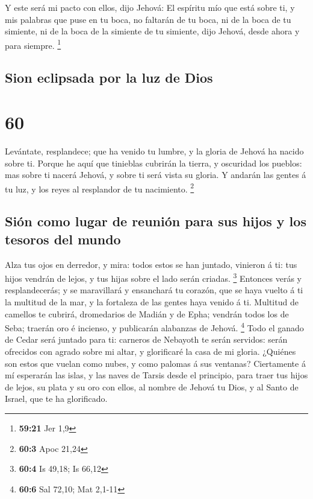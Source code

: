  Y este será mi pacto con ellos, dijo Jehová: El espíritu
mío que está sobre ti, y mis palabras que puse en tu boca, no faltarán
de tu boca, ni de la boca de tu simiente, ni de la boca de la simiente
de tu simiente, dijo Jehová, desde ahora y para siempre. \footnote{\textbf{59:21}
  Jer 1,9}

\hypertarget{sion-eclipsada-por-la-luz-de-dios}{%
\subsection{Sion eclipsada por la luz de
Dios}\label{sion-eclipsada-por-la-luz-de-dios}}

\hypertarget{section-59}{%
\section{60}\label{section-59}}

 Levántate, resplandece; que ha venido tu lumbre, y la
gloria de Jehová ha nacido sobre ti.  Porque he aquí que
tinieblas cubrirán la tierra, y oscuridad los pueblos: mas sobre ti
nacerá Jehová, y sobre ti será vista su gloria.  Y andarán
las gentes á tu luz, y los reyes al resplandor de tu nacimiento.
\footnote{\textbf{60:3} Apoc 21,24}

\hypertarget{siuxf3n-como-lugar-de-reuniuxf3n-para-sus-hijos-y-los-tesoros-del-mundo}{%
\subsection{Sión como lugar de reunión para sus hijos y los tesoros del
mundo}\label{siuxf3n-como-lugar-de-reuniuxf3n-para-sus-hijos-y-los-tesoros-del-mundo}}

 Alza tus ojos en derredor, y mira: todos estos se han
juntado, vinieron á ti: tus hijos vendrán de lejos, y tus hijas sobre el
lado serán criadas. \footnote{\textbf{60:4} Is 49,18; Is 66,12}
 Entonces verás y resplandecerás; y se maravillará y
ensanchará tu corazón, que se haya vuelto á ti la multitud de la mar, y
la fortaleza de las gentes haya venido á ti.  Multitud de
camellos te cubrirá, dromedarios de Madián y de Epha; vendrán todos los
de Seba; traerán oro é incienso, y publicarán alabanzas de Jehová.
\footnote{\textbf{60:6} Sal 72,10; Mat 2,1-11}  Todo el
ganado de Cedar será juntado para ti: carneros de Nebayoth te serán
servidos: serán ofrecidos con agrado sobre mi altar, y glorificaré la
casa de mi gloria.  ¿Quiénes son estos que vuelan como
nubes, y como palomas á sus ventanas?  Ciertamente á mí
esperarán las islas, y las naves de Tarsis desde el principio, para
traer tus hijos de lejos, su plata y su oro con ellos, al nombre de
Jehová tu Dios, y al Santo de Israel, que te ha glorificado.

